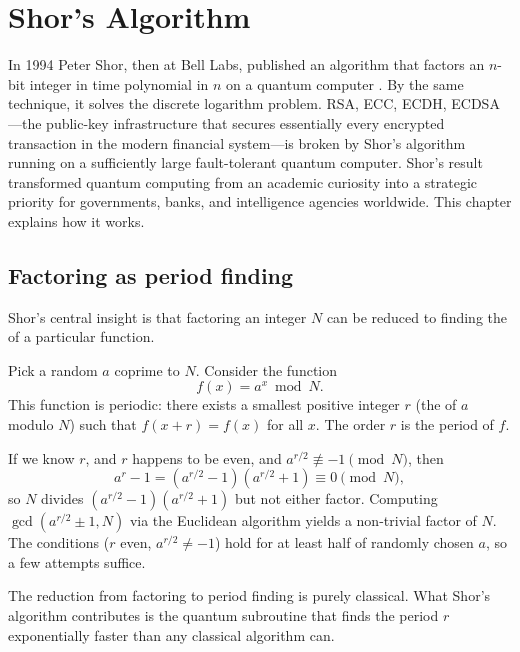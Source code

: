 \chapter{Shor's Algorithm}


In 1994 Peter Shor, then at Bell Labs, published an algorithm that factors an $n$-bit integer in time polynomial in $n$ on a quantum computer \citep{shor_polynomial_1997}. By the same technique, it solves the discrete logarithm problem. RSA, ECC, ECDH, ECDSA---the public-key infrastructure that secures essentially every encrypted transaction in the modern financial system---is broken by Shor's algorithm running on a sufficiently large fault-tolerant quantum computer. Shor's result transformed quantum computing from an academic curiosity into a strategic priority for governments, banks, and intelligence agencies worldwide. This chapter explains how it works.

\section{Factoring as period finding}

Shor's central insight is that factoring an integer $N$ can be reduced to finding the  of a particular function.

Pick a random $a$ coprime to $N$. Consider the function
\[
  f(x) = a^x \bmod N.
\]
This function is periodic: there exists a smallest positive integer $r$ (the  of $a$ modulo $N$) such that $f(x+r) = f(x)$ for all $x$. The order $r$ is the period of $f$.

If we know $r$, and $r$ happens to be even, and $a^{r/2} \not\equiv -1 \pmod{N}$, then
\[
  a^r - 1 = (a^{r/2}-1)(a^{r/2}+1) \equiv 0 \pmod{N},
\]
so $N$ divides $(a^{r/2}-1)(a^{r/2}+1)$ but not either factor. Computing $\gcd(a^{r/2}\pm 1, N)$ via the Euclidean algorithm yields a non-trivial factor of $N$. The conditions ($r$ even, $a^{r/2} \neq -1$) hold for at least half of randomly chosen $a$, so a few attempts suffice.

The reduction from factoring to period finding is purely classical. What Shor's algorithm contributes is the quantum subroutine that finds the period $r$ exponentially faster than any classical algorithm can.

